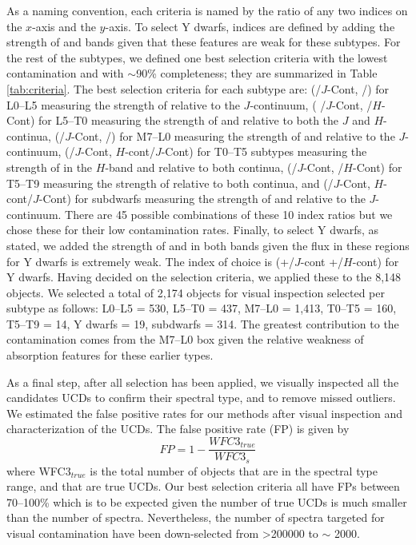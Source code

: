 \documentclass[manuscript]{aastex63}
\begin{document}
As a naming convention, each criteria is named by the ratio of any two indices on the $x$-axis and the $y$-axis. To select Y dwarfs, indices are defined by adding the strength of \wat and \meth bands given that these features are weak for these subtypes. For the rest of the subtypes, we defined one best selection criteria with the lowest contamination and with $\sim$90\% completeness; they are summarized in Table \ref{tab:criteria}. The best selection criteria for each subtype are: (/$J$-Cont,  /) for L0--L5 measuring the strength of \wat relative to the $J$-continuum, (  /$J$-Cont, \indxmeth/$H$-Cont) for L5--T0 measuring the strength of \wat and \meth relative to both the $J$ and $H$-continua, (/$J$-Cont, \indxmeth/) for M7--L0 measuring the strength of \wat and \meth relative to the $J$-continuum, (/$J$-Cont, $H$-cont/$J$-Cont) for T0--T5 subtypes measuring the strength of \wat in the $H$-band and \meth relative to both continua,  (/$J$-Cont, \indxmeth/$H$-Cont) for T5--T9 measuring the strength of \meth relative to both continua, and (/$J$-Cont, $H$-cont/$J$-Cont) for subdwarfs measuring the strength of \wat and \meth relative to the $J$-continuum. There are 45 possible combinations of these 10 index ratios but we chose these for their low contamination rates. Finally, to select Y dwarfs, as stated, we added the strength of \wat and \meth in both bands given the flux in these regions for Y dwarfs is extremely weak. The index of choice is (+\indxmeth/$J$-cont +\indxmeth/$H$-cont) for Y dwarfs. Having decided on the selection criteria, we applied these to the 8,148 objects. We selected a total of 2,174 objects for visual inspection selected per subtype as follows: L0--L5 = 530, L5--T0 = 437, M7--L0 = 1,413, T0--T5 = 160, T5--T9 = 14, Y dwarfs = 19, subdwarfs = 314. The greatest contribution to the contamination comes from the M7--L0 box given the relative weakness of absorption features for these earlier types. 

As a final step, after all selection has been applied, we visually inspected all the candidates UCDs to confirm their spectral type, and to remove missed outliers. We estimated the false positive rates for our methods after visual inspection and characterization of the UCDs. The false positive rate (FP) is given by \begin{equation}
FP=1-\frac{WFC3_{true}}{WFC3_{s}}
\end{equation} where WFC3$_{true}$ is the total number of objects that are in the spectral type range, and that are true UCDs. Our best selection criteria all have FPs between 70--100\% which is to be expected given the number of true UCDs is much smaller than the number of spectra. Nevertheless, the number of spectra targeted for visual contamination have been down-selected from \textgreater 200000 to $\sim$ 2000. 
\end{document}
